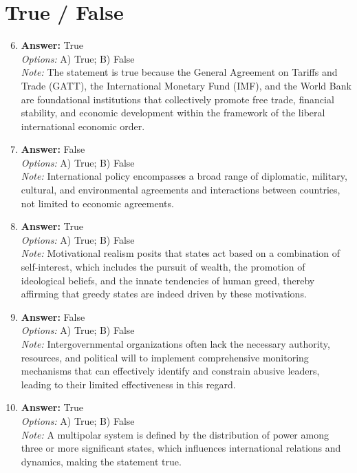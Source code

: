 \documentclass[12pt]{article}
\begin{document}
\section*{True / False}
\begin{enumerate}[label=\arabic*.]
\setcounter{enumi}{5}
\item \textbf{Answer:} True
\\ \textit{Options:} A) True; B) False
\\ \textit{Note:} The statement is true because the General Agreement on Tariffs and Trade (GATT), the International Monetary Fund (IMF), and the World Bank are foundational institutions that collectively promote free trade, financial stability, and economic development within the framework of the liberal international economic order.
\item \textbf{Answer:} False
\\ \textit{Options:} A) True; B) False
\\ \textit{Note:} International policy encompasses a broad range of diplomatic, military, cultural, and environmental agreements and interactions between countries, not limited to economic agreements.
\item \textbf{Answer:} True
\\ \textit{Options:} A) True; B) False
\\ \textit{Note:} Motivational realism posits that states act based on a combination of self-interest, which includes the pursuit of wealth, the promotion of ideological beliefs, and the innate tendencies of human greed, thereby affirming that greedy states are indeed driven by these motivations.
\item \textbf{Answer:} False
\\ \textit{Options:} A) True; B) False
\\ \textit{Note:} Intergovernmental organizations often lack the necessary authority, resources, and political will to implement comprehensive monitoring mechanisms that can effectively identify and constrain abusive leaders, leading to their limited effectiveness in this regard.
\item \textbf{Answer:} True
\\ \textit{Options:} A) True; B) False
\\ \textit{Note:} A multipolar system is defined by the distribution of power among three or more significant states, which influences international relations and dynamics, making the statement true.
\end{enumerate}
\end{document}
